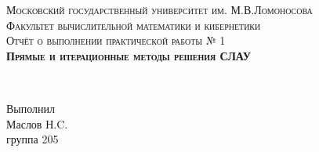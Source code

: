\begin{titlepage}




\center %
 

\textsc{\Large Московский государственный университет им. М.В.Ломоносова}\\[0.5cm] %
\textsc{\Large Факультет вычислительной математики и кибернетики}\\[7.5cm] %


\textsc{\LARGE Отчёт о выполнении практической работы № 1}\\[1cm]
\textsc{\LARGE \huge \bfseries Прямые и итерационные методы решения СЛАУ}\\[5cm] %
 

\begin{minipage}{0.4\textwidth}
\begin{flushleft} \large

\end{flushleft}
\end{minipage}
~
\begin{minipage}{0.4\textwidth}
\begin{flushright} \large
Выполнил \\[0.3cm]
Маслов Н.C. \\ группа 205 %
\end{flushright}
\end{minipage}\\[4cm]



\end{titlepage}
